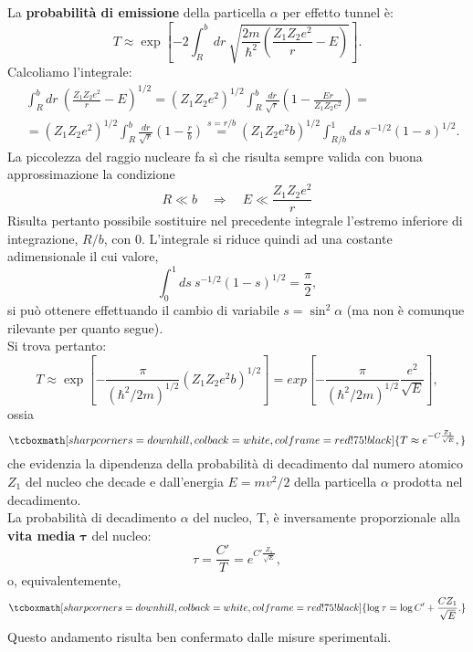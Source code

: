 \documentclass[a4paper,12pt,oneside]{book}
\begin{document}
La \textbf{probabilità di emissione} della particella $\alpha$ per effetto tunnel è:
	\begin{equation}
		T \approx \exp \left[ -2 \int _R ^b dr\ \sqrt{\frac{2m}{\hbar ^2}\left(\frac{Z_1 Z_2 e^2}{r}-E\right)}\right].
	\end{equation}
Calcoliamo l'integrale:
	\begin{align}
		&\displaystyle{\int _R ^b dr\ \left(\frac{Z_1 Z_2 e^2}{r}-E\right)^{1/2}=\left(Z_1 Z_2 e^2\right)^{1/2}\int _R ^b \frac{dr}{\sqrt{r}}\left(1-\frac{Er}{Z_1 Z_2 e^2}\right)=}\nonumber \\
		&\displaystyle{=\left(Z_1 Z_2 e^2\right)^{1/2}\int _R ^b \frac{dr}{\sqrt{r}}\left(1-\frac{r}{b}\right)\overset{s=r/b}{=}}\displaystyle{\left(Z_1 Z_2 e^2 b\right)^{1/2}\int _{R/b} ^1 ds\ s^{-1/2} (1-s)^{1/2}}.
	\end{align}
La piccolezza del raggio nucleare fa sì che risulta sempre valida con buona approssimazione la condizione
	\begin{equation}
		R\ll b \quad \Rightarrow \quad E \ll \frac{Z_1 Z_2 e^2}{r}
	\end{equation}
Risulta pertanto possibile sostituire nel precedente integrale l'estremo inferiore di integrazione, $R/b$, con $0$. L'integrale si riduce quindi ad una costante adimensionale il cui valore,
	\begin{equation}
		\int _{0} ^1 ds\ s^{-1/2} (1-s)^{1/2}= \frac{\pi}{2},
	\end{equation}
si può ottenere effettuando il cambio di variabile $s= \sin^2 \alpha$ (ma non è comunque rilevante per quanto segue).\\
Si trova pertanto:
	\begin{equation}
		T\approx  \exp \left[ -\frac{\pi}{(\hbar ^2 /2m)^{1/2}}\left(Z_1 Z_2 e^2 b\right)^{1/2}\right]=  exp \left[ -\frac{\pi}{(\hbar ^2 /2m)^{1/2}}\frac{e^2}{\sqrt{E}}\right],
	\end{equation}
ossia
	\begin{equation}
		\tcboxmath[sharp corners=downhill, colback=white, colframe=red!75!black]{
			T \approx e^{-C\frac{Z_1}{\sqrt{E}}},
			}
	\end{equation}
che evidenzia la dipendenza della probabilità di decadimento dal numero atomico $Z_1$ del nucleo che decade e dall'energia $E=mv^2/2$ della particella $\alpha$ prodotta nel decadimento.\\

La probabilità di decadimento $\alpha$ del nucleo, T, è inversamente proporzionale alla \textbf{vita media} $\mathbf{\tau}$ del nucleo:
	\begin{equation}
		\tau=\frac{C'}{T}=e^{C'\frac{Z_1}{\sqrt{E}}},
	\end{equation}
o, equivalentemente,
	\begin{equation}
		\tcboxmath[sharp corners=downhill, colback=white, colframe=red!75!black]{
			\log \tau = \log C' + \frac{C Z_1}{\sqrt{E}}.
			}
	\end{equation}
Questo andamento risulta ben confermato dalle misure sperimentali.
\end{document}
